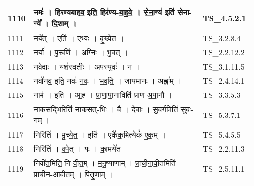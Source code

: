 \documentclass[17pt]{extarticle}
\begin{document}
\begin{longtable}{||p{0.4in}||p{4.9in}||p{0.9in}||}
    \hline
        
    1110 & नमः॑   ।   हिर॑ण्यबाहव॒ इति॒ हिर॑ण्य{-}बा॒ह॒वे॒   ।   से॒ना॒न्य॑ इति॑ सेना{-}न्ये᳚   ।   दि॒शाम्   ।    & TS\_4.5.2.1       \\
    
    \hline
        
    1111 & नये᳚त्   ।   एति॑   ।   ए॒भ्यः॒   ।   वृ॒श्च्ये॒त॒   ।    & TS\_3.2.8.4       \\
    
    \hline
        
    1112 & नर्या᳚   ।   पु॒रूणि॑   ।   अ॒ग्निः   ।   भु॒व॒त्   ।    & TS\_2.2.12.2       \\
    
    \hline
        
    1113 & नवे॑दाः   ।   यश॑स्वतीः   ।   अ॒प॒स्युवः॑   ।   न   ।    & TS\_3.1.11.5       \\
    
    \hline
        
    1114 & नवो॑नव॒ इति॒ नवः॑{-}न॒वः॒   ।   भ॒व॒ति॒   ।   जाय॑मानः   ।   अह्ना᳚म्   ।    & TS\_2.4.14.1       \\
    
    \hline
        
    1115 & नाम॑   ।   इति॑   ।   आ॒ह॒   ।   प्रा॒णा॒पा॒नाविति॑ प्राण{-}अ॒पा॒नौ   ।    & TS\_3.3.5.3       \\
    
    \hline
        
    1116 & ना॒क॒सद्भि॒रिति॑ नाक॒सत्{-}भिः॒   ।   वै   ।   दे॒वाः   ।   सु॒व॒र्गमिति॑ सुवः{-}गम्   ।    & TS\_5.3.7.1       \\
    
    \hline
        
    1117 & निरिति॑   ।   मु॒च्ये॒त॒   ।   इति॑   ।   एकै॑क॒मित्येकं᳚{-}ए॒क॒म्   ।    & TS\_5.4.5.5       \\
    
    \hline
        
    1118 & निरिति॑   ।   व॒पे॒त्   ।   यः   ।   का॒मये॑त   ।    & TS\_2.2.11.3       \\
    
    \hline
        
    1119 & निवी॑त॒मिति॒ नि{-}वी॒त॒म्   ।   म॒नु॒ष्या॑णाम्   ।   प्रा॒ची॒ना॒वी॒तमिति॑ प्राचीन{-}आ॒वी॒तम्   ।   पि॒तृ॒णाम्   ।    & TS\_2.5.11.1       \\
    
    \hline
        

\end{longtable}
\end{document}
